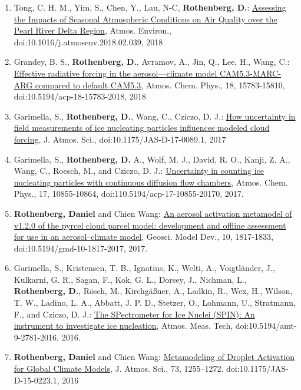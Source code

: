 \documentclass[11pt,letterpaper]{article}
\begin{document}
\begin{enumerate}[itemindent=-10pt]
 \item Tong, C. H. M., Yim, S., Chen, Y., Lau, N-C, \textbf{Rothenberg, D.}: \href{https://doi.org/10.1016/j.atmosenv.2018.02.039}{Assessing the Impacts of Seasonal Atmospheric Conditions on Air Quality over the Pearl River Delta Region}, Atmos. Environ., doi:10.1016/j.atmosenv.2018.02.039, 2018

 \item Grandey, B. S., \textbf{Rothenberg, D.}, Avramov, A., Jin, Q., Lee, H., Wang, C.: \href{https://doi.org/10.5194/acp-18-15783-2018}{Effective radiative forcing in the aerosol—climate model CAM5.3-MARC-ARG compared to default CAM5.3}, Atmos. Chem. Phys., 18, 15783-15810, doi:10.5194/acp-18-15783-2018, 2018

 \item Garimella, S., \textbf{Rothenberg, D.}, Wang, C., Cziczo, D. J.: \href{http://dx.doi.org/10.1175/JAS-D-17-0089.1}{How uncertainty in field measurements of ice nucleating particles influences modeled cloud forcing}, J. Atmos. Sci., doi:10.1175/JAS-D-17-0089.1, 2017

 \item Garimella, S., \textbf{Rothenberg, D.} A., Wolf, M. J., David, R. O., Kanji, Z. A., Wang, C., Roesch, M., and Cziczo, D. J.: \href{https://doi.org/10.5194/acp-17-10855-2017}{Uncertainty in counting ice nucleating particles with continuous diffusion flow chambers}, Atmos. Chem. Phys., 17, 10855-10864, doi:110.5194/acp-17-10855-20170, 2017.

 \item \textbf{Rothenberg, Daniel} and Chien Wang:  \href{http://dx.doi.org/10.5194/gmd-10-1817-2017}{An aerosol activation metamodel of v1.2.0 of the pyrcel cloud parcel model: development and offline assessment for use in an aerosol–climate model}, Geosci. Model Dev., 10, 1817-1833, doi:10.5194/gmd-10-1817-2017, 2017.

 \item Garimella, S., Kristensen, T. B., Ignatius, K., Welti, A., Voigtländer, J., Kulkarni, G. R., Sagan, F., Kok, G. L., Dorsey, J., Nichman, L., \textbf{Rothenberg, D.}, Rösch, M., Kirchgäßner, A., Ladkin, R., Wex, H., Wilson, T. W., Ladino, L. A., Abbatt, J. P. D., Stetzer, O., Lohmann, U., Stratmann, F., and Cziczo, D. J.: \href{http://www.atmos-meas-tech.net/9/2781/2016/amt-9-2781-2016.html}{The SPectrometer for Ice Nuclei (SPIN): An instrument to investigate ice nucleation}, Atmos. Meas. Tech, doi:10.5194/amt-9-2781-2016, 2016.

 \item \textbf{Rothenberg, Daniel} and Chien Wang: \href{http://dx.doi.org/10.1175/JAS-D-15-0223.1}{Metamodeling of Droplet Activation for Global Climate Models}, J. Atmos. Sci., 73, 1255–1272. doi:10.1175/JAS-D-15-0223.1, 2016


\end{enumerate}
\end{document}
